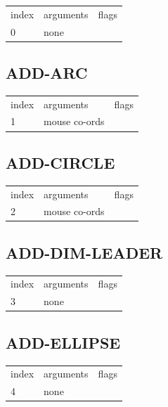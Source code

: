 \documentclass[11pt]{report}
\begin{document}
\begin{center}
\begin{tabular}{l | l | l}
index & arguments & flags \\
0 & none & 
\end{tabular}
\end{center}

\subsection{ADD-ARC}

\begin{center}
\begin{tabular}{l | l | l}
index & arguments & flags \\
1 & mouse co-ords & 
\end{tabular}
\end{center}

\subsection{ADD-CIRCLE}

\begin{center}
\begin{tabular}{l | l | l}
index & arguments & flags \\
2 & mouse co-ords & 
\end{tabular}
\end{center}

\subsection{ADD-DIM-LEADER}

\begin{center}
\begin{tabular}{l | l | l}
index & arguments & flags \\
3 & none & 
\end{tabular}
\end{center}

\subsection{ADD-ELLIPSE}

\begin{center}
\begin{tabular}{l | l | l}
index & arguments & flags \\
4 & none & 
\end{tabular}
\end{center}
\end{document}

